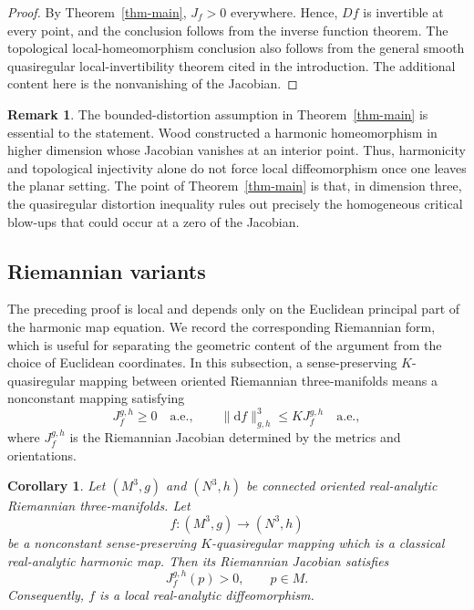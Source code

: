 \documentclass[10pt]{amsart}
\numberwithin{equation}{section}
\newtheorem{corollary}[theorem]{Corollary}
\theoremstyle{definition}
\newtheorem{remark}{Remark}[section]
\begin{document}
\begin{proof}
By Theorem~\ref{thm-main}, \(J_f>0\) everywhere. Hence, \(Df\) is invertible
at every point, and the conclusion follows from the inverse function theorem.
The topological local-homeomorphism conclusion also follows from the general
smooth quasiregular local-invertibility theorem cited in the introduction. The
additional content here is the nonvanishing of the Jacobian.
\end{proof}

\begin{remark}
The bounded-distortion assumption in Theorem~\ref{thm-main} is essential to
the statement. Wood \cite{Wood1991} constructed a harmonic homeomorphism in
higher dimension whose Jacobian vanishes at an interior point. Thus,
harmonicity and topological injectivity alone do not force local
diffeomorphism once one leaves the planar setting. The point of
Theorem~\ref{thm-main} is that, in dimension three, the quasiregular
distortion inequality rules out precisely the homogeneous critical blow-ups
that could occur at a zero of the Jacobian.
\end{remark}

\subsection{Riemannian variants}

The preceding proof is local and depends only on the Euclidean principal part
of the harmonic map equation. We record the corresponding Riemannian form,
which is useful for separating the geometric content of the argument from the
choice of Euclidean coordinates. In this subsection, a sense-preserving
\(K\)-quasiregular mapping between oriented Riemannian three-manifolds means a
nonconstant mapping satisfying
\[
        J_f^{g,h}\ge 0\quad\text{a.e.},
        \qquad
        \|\mathrm{d}f\|_{g,h}^3\le KJ_f^{g,h}\quad\text{a.e.},
\]
where \(J_f^{g,h}\) is the Riemannian Jacobian determined by the metrics and
orientations.

\begin{corollary}
\label{cor-riemannian-lewy}
Let \((M^3,g)\) and \((N^3,h)\) be connected oriented real-analytic
Riemannian three-manifolds. Let
\[
        f:(M^3,g)\to (N^3,h)
\]
be a nonconstant sense-preserving \(K\)-quasiregular mapping which is a
classical real-analytic harmonic map. Then its Riemannian Jacobian satisfies
\[
        J_f^{g,h}(p)>0,
        \qquad p\in M.
\]
Consequently, \(f\) is a local real-analytic diffeomorphism.
\end{corollary}
\end{document}
